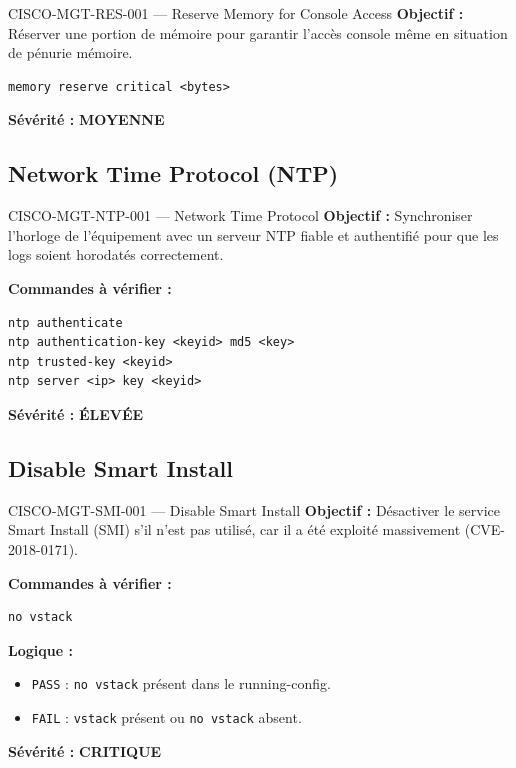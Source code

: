 \documentclass[12pt, a4paper]{report}
\begin{document}
\begin{rulebox}{CISCO-MGT-RES-001 — Reserve Memory for Console Access}
  \textbf{Objectif :} Réserver une portion de mémoire pour garantir l'accès console même en situation de pénurie mémoire.

  \begin{lstlisting}
memory reserve critical <bytes>
  \end{lstlisting}

  \textbf{Sévérité :} \textcolor{accentGreen}{\textbf{MOYENNE}}
\end{rulebox}

\subsection{Network Time Protocol (NTP)}

\begin{rulebox}{CISCO-MGT-NTP-001 — Network Time Protocol}
  \textbf{Objectif :} Synchroniser l'horloge de l'équipement avec un serveur NTP fiable et authentifié pour que les logs soient horodatés correctement.

  \textbf{Commandes à vérifier :}
  \begin{lstlisting}
ntp authenticate
ntp authentication-key <keyid> md5 <key>
ntp trusted-key <keyid>
ntp server <ip> key <keyid>
  \end{lstlisting}

  \textbf{Sévérité :} \textcolor{accentOrange}{\textbf{ÉLEVÉE}}
\end{rulebox}

\subsection{Disable Smart Install}

\begin{rulebox}{CISCO-MGT-SMI-001 — Disable Smart Install}
  \textbf{Objectif :} Désactiver le service Smart Install (SMI) s'il n'est pas utilisé, car il a été exploité massivement (CVE-2018-0171).

  \textbf{Commandes à vérifier :}
  \begin{lstlisting}
no vstack
  \end{lstlisting}

  \textbf{Logique :}
  \begin{itemize}
    \item \texttt{PASS} : \texttt{no vstack} présent dans le running-config.
    \item \texttt{FAIL} : \texttt{vstack} présent ou \texttt{no vstack} absent.
  \end{itemize}

  \textbf{Sévérité :} \textcolor{accentRed}{\textbf{CRITIQUE}}
\end{rulebox}
\end{document}
